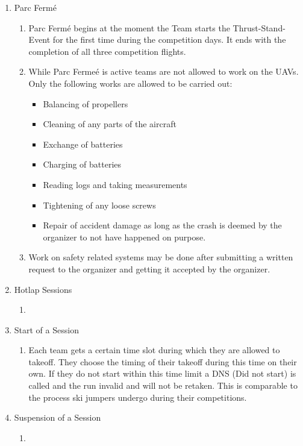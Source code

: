 \begin{enumerate}
    \item{Parc Fermé}
    \begin{enumerate}
      \item Parc Fermé begins at the moment the Team starts the Thrust-Stand-Event for the first time during the competition days. It ends with the completion of all three competition flights. 
      \item While Parc Fermeé is active teams are not allowed to work on the UAVs. Only the following works are allowed to be carried out: 
      \begin{itemize}
        \item Balancing of propellers
        \item Cleaning of any parts of the aircraft
        \item Exchange of batteries
        \item Charging of batteries 
        \item Reading logs and taking measurements
        \item Tightening of any loose screws
        \item Repair of accident damage as long as the crash is deemed by the organizer to not have happened on purpose. 
      \end{itemize}
      \item Work on safety related systems may be done after submitting a written request to the organizer and getting it accepted by the organizer. 
    \end{enumerate}
  
    \item{Hotlap Sessions}
    \begin{enumerate}
      \item 
    \end{enumerate}

    \item{Start of a Session}
    \begin{enumerate}
      \item Each team gets a certain time slot during which they are allowed to takeoff. They choose the timing of their takeoff during this time on their own. If they do not start within this time limit a DNS (Did not start) is called and the run invalid and will not be retaken. This is comparable to the process ski jumpers undergo during their competitions. 
    \end{enumerate}

    \item{Suspension of a Session}
    \begin{enumerate}
      \item 
    \end{enumerate}


\end{enumerate}
